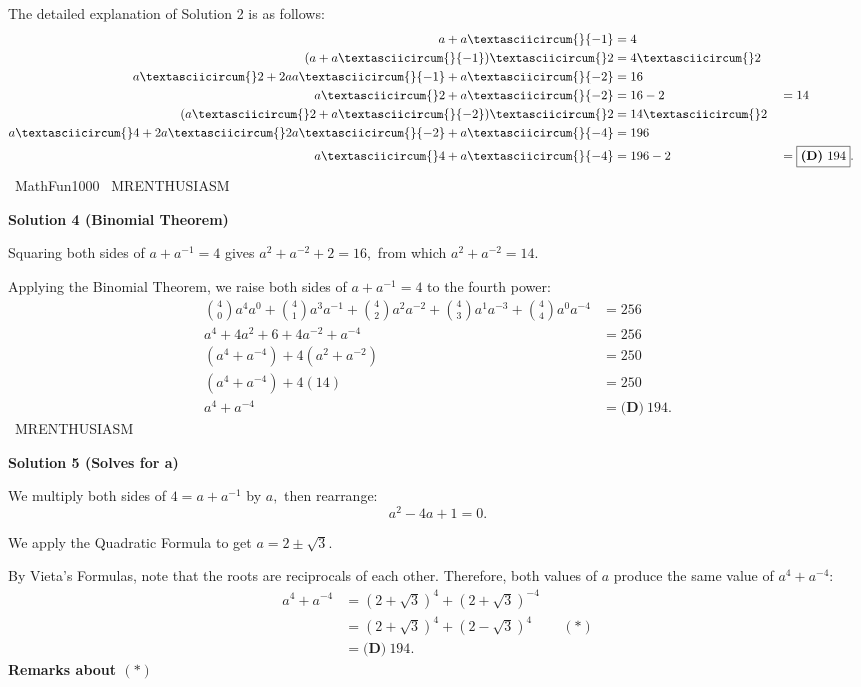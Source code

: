 \begin{enumerate}
The detailed explanation of Solution 2 is as follows:
 \begin{alignat*}{8} a+a\textasciicircum{}{-1}&=4 \\ (a+a\textasciicircum{}{-1})\textasciicircum{}2&=4\textasciicircum{}2 \\ a\textasciicircum{}2+2aa\textasciicircum{}{-1}+a\textasciicircum{}{-2}&=16 \\ a\textasciicircum{}2+a\textasciicircum{}{-2}&=16-2&&=14 \\ (a\textasciicircum{}2+a\textasciicircum{}{-2})\textasciicircum{}2&=14\textasciicircum{}2 \\ a\textasciicircum{}4+2a\textasciicircum{}2a\textasciicircum{}{-2}+a\textasciicircum{}{-4}&=196 \\ a\textasciicircum{}4+a\textasciicircum{}{-4}&=196-2&&=\boxed{\textbf{(D)}\ 194}. \\ \end{alignat*}~MathFun1000 ~MRENTHUSIASM

 



\textbf{Solution 4 (Binomial Theorem)}

Squaring both sides of $a+a^{-1}=4$ gives $a^2+a^{-2}+2=16,$ from which $a^2+a^{-2}=14.$

 Applying the Binomial Theorem, we raise both sides of $a+a^{-1}=4$ to the fourth power:
 \begin{align*} \binom40a^4a^0+\binom41a^3a^{-1}+\binom42a^2a^{-2}+\binom43a^1a^{-3}+\binom44a^0a^{-4}&=256 \\ a^4+4a^2+6+4a^{-2}+a^{-4}&=256 \\ \left(a^4+a^{-4}\right)+4\left(a^2+a^{-2}\right)&=250 \\ \left(a^4+a^{-4}\right)+4(14)&=250 \\ a^4+a^{-4}&=\boxed{\textbf{(D)}\ 194}. \end{align*}
~MRENTHUSIASM

 



\textbf{Solution 5 (Solves for a)}

We multiply both sides of $4=a+a^{-1}$ by $a,$ then rearrange: 
 \[a^2-4a+1=0.\]

 We apply the Quadratic Formula to get $a=2\pm\sqrt3.$ 

 By Vieta's Formulas, note that the roots are reciprocals of each other. Therefore, both values of $a$ produce the same value of $a^4+a^{-4}:$
 \begin{align*} a^4+a^{-4}&=\left(2+\sqrt{3}\right)^4 + \left(2+\sqrt{3}\right)^{-4} \\ &=\left(2+\sqrt{3}\right)^4+\left(2-\sqrt{3}\right)^4 &&(*) \\ &=\boxed{\textbf{(D)}\ 194}. \end{align*}
\textbf{Remarks about $\boldsymbol{(*)}$}


\end{enumerate}

